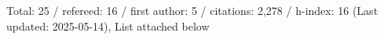 Total: 25 / refereed: 16 / first author: 5 / citations: 2,278 / h-index: 16 (Last updated: 2025-05-14), List attached below